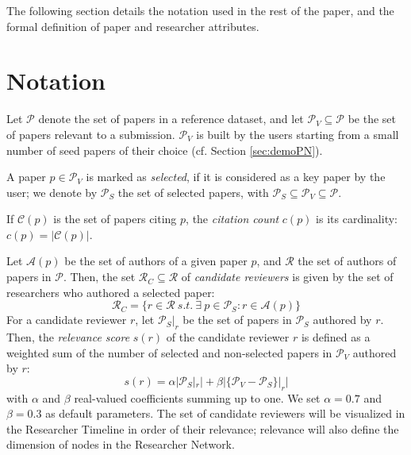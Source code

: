 The following section details the notation used in the rest of the paper, and the formal definition of paper and researcher attributes. 

\section{Notation}

Let $\mathcal{P}$ denote the set of papers in a reference dataset, %
and let $\mathcal{P}_{V} \subseteq \mathcal{P}$ be the set of papers relevant to a submission. %
$\mathcal{P}_{V}$ is built by the users starting from a small number of seed papers of their choice (cf. Section \ref{sec:demoPN}).%

A paper $p \in \mathcal{P}_{V}$ is marked as \emph{selected}, if it is considered as a key paper by the user; we denote by $\mathcal{P}_{S}$ the set of selected papers, with $\mathcal{P}_{S} \subseteq \mathcal{P}_{V} \subseteq \mathcal{P}$. 

If $\mathcal{C}(p)$ is the set of papers citing $p$, the \emph{citation count} $c(p)$ is its cardinality: $c(p) = \vert \mathcal{C}(p) \vert$.

Let $\mathcal{A}(p)$ be the set of authors of a given paper $p$, and $\mathcal{R}$ the set of authors of papers in $\mathcal{P}$. 
Then, the set $\mathcal{R}_C \subseteq \mathcal{R}$ of \emph{candidate reviewers} is given by the set of researchers who authored a selected paper: $$\mathcal{R}_{C} = \{r \in \mathcal{R} \ s.t. \ \exists \ p \in \mathcal{P}_S : r \in \mathcal{A}(p)\}$$ %
%
For a candidate reviewer $r$, let $\mathcal{P}_{S}|_{r}$ be the set of papers in $\mathcal{P}_{S}$ authored by $r$. Then, the \emph{relevance score} $s(r)$ of the candidate reviewer $r$ is defined as a weighted sum of the number of selected and non-selected papers in $\mathcal{P}_V$ authored by $r$: $$s(r) = \alpha \vert \mathcal{P}_{S}|_{r} \vert + \beta \vert \{\mathcal{P}_{V} - \mathcal{P}_{S}\}|_{r}\vert$$ with $\alpha$ and $\beta$ real-valued coefficients summing up to one. We set $\alpha = 0.7$ and $\beta = 0.3$ as default parameters. The set of candidate reviewers will be visualized in the Researcher Timeline in order of their relevance; relevance will also define the dimension of nodes in the Researcher Network.

